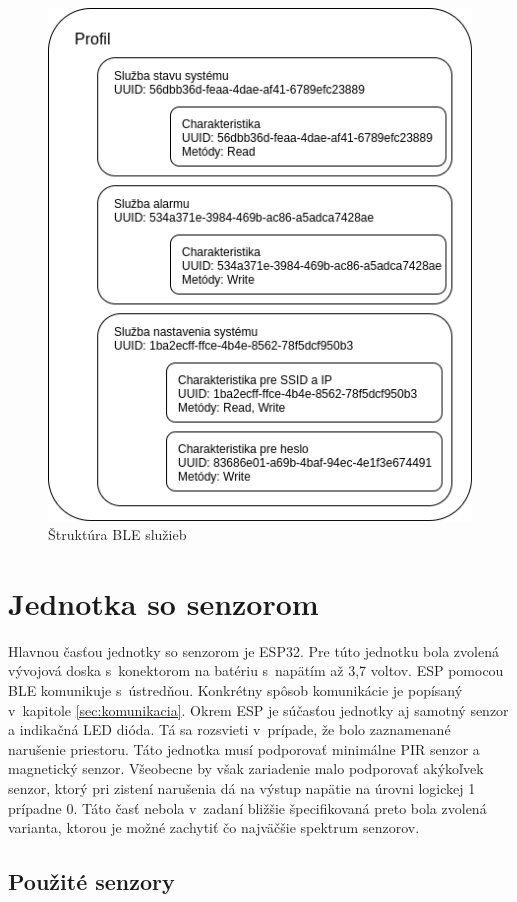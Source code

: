 \begin{figure}[ht]
    \centering
    \includegraphics[scale=0.5]{obrazky-figures/BLE_structure.png}
    \caption{Štruktúra BLE služieb}
    \label{fig:BLE_structure}
\end{figure}

\section{Jednotka so senzorom}

Hlavnou časťou jednotky so senzorom je ESP32. Pre túto jednotku bola zvolená vývojová doska s~konektorom na batériu s~napätím až 3,7 voltov. ESP pomocou BLE komunikuje s~ústredňou. Konkrétny spôsob komunikácie je popísaný v~kapitole \ref{sec:komunikacia}. Okrem ESP je súčasťou jednotky aj samotný senzor a indikačná LED dióda. Tá sa rozsvieti v~prípade, že bolo zaznamenané narušenie priestoru. Táto jednotka musí podporovať minimálne PIR senzor a magnetický senzor. Všeobecne by však zariadenie malo podporovať akýkoľvek senzor, ktorý pri zistení narušenia dá na výstup napätie na úrovni logickej 1 prípadne 0. Táto časť nebola v~zadaní bližšie špecifikovaná preto bola zvolená varianta, ktorou je možné zachytiť čo najväčšie spektrum senzorov.

\subsection{Použité senzory}

